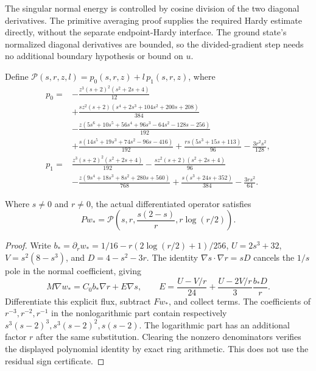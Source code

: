 \begin{remark}
The singular normal energy is controlled by cosine division of the two
diagonal derivatives. The primitive averaging proof supplies the required
Hardy estimate directly, without the separate endpoint-Hardy interface.
The ground state's normalized diagonal derivatives are bounded, so the
divided-gradient step needs no additional boundary hypothesis or bound on $u$.
\end{remark}

\begin{definition}
\label{def:dd-residual-polynomial}
\leanok
Define $\mathcal P(s,r,z,l)=p_0(s,r,z)+l\,p_1(s,r,z)$, where
\begin{align*}
p_0={}&-\frac{z^3(s+2)^2(s^2+2s+4)}{12}\\
&+\frac{sz^2(s+2)(s^4+2s^3+104s^2+200s+208)}{384}\\
&-\frac{z(5s^6+10s^5+56s^4+96s^3-64s^2-128s-256)}{192}\\
&+\frac{s(14s^5+19s^3+74s^2-96s-416)}{192}
 +\frac{rs(5s^3+15s+113)}{96}-\frac{3r^2s^2}{128},\\
p_1={}&\frac{z^3(s+2)^2(s^2+2s+4)}{192}
 -\frac{sz^2(s+2)(s^2+2s+4)}{96}\\
&-\frac{z(9s^4+18s^3+8s^2+280s+560)}{768}
 +\frac{s(s^3+24s+352)}{384}-\frac{3rs^2}{64}.
\end{align*}
\end{definition}

\begin{lemma}
\label{lem:dd-ground-residual-factorization}
\leanok
Where $s\ne0$ and $r\ne0$, the actual differentiated operator satisfies
\[
 Pw_*=\mathcal P\left(s,r,\frac{s(2-s)}r,r\log(r/2)\right).
\]
\end{lemma}

\begin{proof}
\leanok
Write $b_*=\partial_rw_*=1/16-r(2\log(r/2)+1)/256$,
$U=2s^3+32$, $V=s^2(8-s^3)$, and $D=4-s^2-3r$. The identity
$\nabla s\cdot\nabla r=sD$ cancels the $1/s$ pole in the normal coefficient,
giving
\[
 M\nabla w_*=C_0b_*\nabla r+E\nabla s,\qquad
 E=\frac{U-V/r}{24}+\frac{U-2V/r}{3}\frac{b_*D}{r}.
\]
Differentiate this explicit flux, subtract $Fw_*$, and collect terms.
The coefficients of $r^{-3},r^{-2},r^{-1}$ in the nonlogarithmic part
contain respectively $s^3(s-2)^3,s^3(s-2)^2,s(s-2)$.
The logarithmic part has an additional factor $r$ after the same substitution.
Clearing the nonzero denominators verifies the displayed polynomial identity
by exact ring arithmetic. This does not use the residual sign certificate.
\end{proof}

